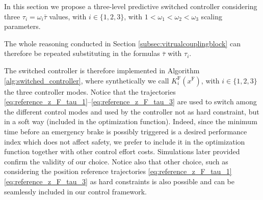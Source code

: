 \documentclass[letterpaper, 10 pt, conference]{ieeeconf}
\theoremstyle{definition}
\theoremstyle{nopoint}
\begin{document}
In this section we propose a three-level predictive switched controller considering three $\tau_i=\omega_i \bar{\tau}$ values, with $i\in \{1,2,3\}$, with $1<\omega_1 < \omega_2< \omega_3$ scaling parameters. 

The whole reasoning conducted in Section \ref{subsec:vitrualcouplingblock} can therefore be repeated substituting in the formulas $\bar{\tau}$ with $\tau_i$. 

The switched controller is therefore implemented in Algorithm \ref{alg:switched_controller}, where synthetically we call $K^{\mathrm{F}}_i(x^{\mathrm{F}})$, with $i\in \{1,2,3\}$ the three controller modes. Notice that the trajectories \eqref{eq:reference_z_F_tau_1}–\eqref{eq:reference_z_F_tau_3} are used to switch among the different control modes and used by the controller not as hard constraint, but in a soft way (included in the optimization function). Indeed, since the minimum time before an emergency brake is possibly triggered is a desired performance index which does not affect safety, we prefer to include it in the optimization function together with other control effort costs. Simulations later provided confirm the validity of our choice. Notice also that other choice, such as considering the position reference trajectories \eqref{eq:reference_z_F_tau_1} \textemdash{} \eqref{eq:reference_z_F_tau_3} as hard constraints is also possible and can be seamlessly included in our control framework.
\end{document}
